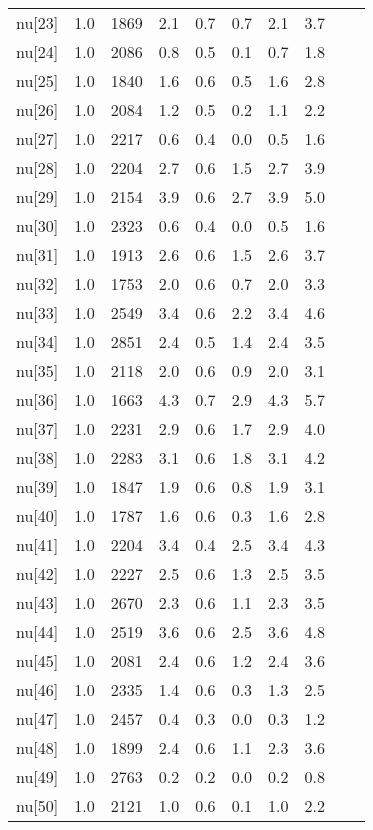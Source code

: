 \begin{longtable}{lrrrrrrr p{} | p{} |}
  nu[23] & 1.0 & 1869 & 2.1 & 0.7 & 0.7 & 2.1 & 3.7 \\ 
  nu[24] & 1.0 & 2086 & 0.8 & 0.5 & 0.1 & 0.7 & 1.8 \\ 
  nu[25] & 1.0 & 1840 & 1.6 & 0.6 & 0.5 & 1.6 & 2.8 \\ 
  nu[26] & 1.0 & 2084 & 1.2 & 0.5 & 0.2 & 1.1 & 2.2 \\ 
  nu[27] & 1.0 & 2217 & 0.6 & 0.4 & 0.0 & 0.5 & 1.6 \\ 
  nu[28] & 1.0 & 2204 & 2.7 & 0.6 & 1.5 & 2.7 & 3.9 \\ 
  nu[29] & 1.0 & 2154 & 3.9 & 0.6 & 2.7 & 3.9 & 5.0 \\ 
  nu[30] & 1.0 & 2323 & 0.6 & 0.4 & 0.0 & 0.5 & 1.6 \\ 
  nu[31] & 1.0 & 1913 & 2.6 & 0.6 & 1.5 & 2.6 & 3.7 \\ 
  nu[32] & 1.0 & 1753 & 2.0 & 0.6 & 0.7 & 2.0 & 3.3 \\ 
  nu[33] & 1.0 & 2549 & 3.4 & 0.6 & 2.2 & 3.4 & 4.6 \\ 
  nu[34] & 1.0 & 2851 & 2.4 & 0.5 & 1.4 & 2.4 & 3.5 \\ 
  nu[35] & 1.0 & 2118 & 2.0 & 0.6 & 0.9 & 2.0 & 3.1 \\ 
  nu[36] & 1.0 & 1663 & 4.3 & 0.7 & 2.9 & 4.3 & 5.7 \\ 
  nu[37] & 1.0 & 2231 & 2.9 & 0.6 & 1.7 & 2.9 & 4.0 \\ 
  nu[38] & 1.0 & 2283 & 3.1 & 0.6 & 1.8 & 3.1 & 4.2 \\ 
  nu[39] & 1.0 & 1847 & 1.9 & 0.6 & 0.8 & 1.9 & 3.1 \\ 
  nu[40] & 1.0 & 1787 & 1.6 & 0.6 & 0.3 & 1.6 & 2.8 \\ 
  nu[41] & 1.0 & 2204 & 3.4 & 0.4 & 2.5 & 3.4 & 4.3 \\ 
  nu[42] & 1.0 & 2227 & 2.5 & 0.6 & 1.3 & 2.5 & 3.5 \\ 
  nu[43] & 1.0 & 2670 & 2.3 & 0.6 & 1.1 & 2.3 & 3.5 \\ 
  nu[44] & 1.0 & 2519 & 3.6 & 0.6 & 2.5 & 3.6 & 4.8 \\ 
  nu[45] & 1.0 & 2081 & 2.4 & 0.6 & 1.2 & 2.4 & 3.6 \\ 
  nu[46] & 1.0 & 2335 & 1.4 & 0.6 & 0.3 & 1.3 & 2.5 \\ 
  nu[47] & 1.0 & 2457 & 0.4 & 0.3 & 0.0 & 0.3 & 1.2 \\ 
  nu[48] & 1.0 & 1899 & 2.4 & 0.6 & 1.1 & 2.3 & 3.6 \\ 
  nu[49] & 1.0 & 2763 & 0.2 & 0.2 & 0.0 & 0.2 & 0.8 \\ 
  nu[50] & 1.0 & 2121 & 1.0 & 0.6 & 0.1 & 1.0 & 2.2 \\ 

\end{longtable}
